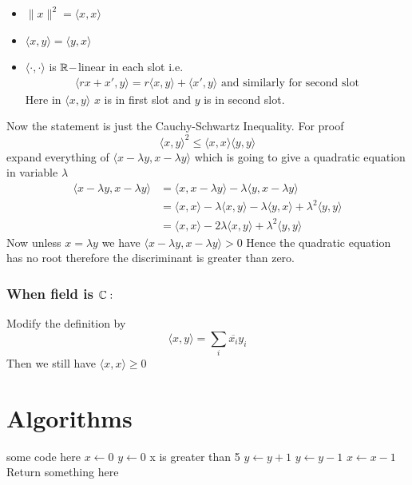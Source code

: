 \documentclass[a4paper]{report}
\begin{document}
{	\begin{note}
		\begin{itemize}
			\item $\|x\|^2=\langle x,x\rangle$
			\item $\langle x,y\rangle=\langle y,x\rangle$
			\item $\langle \cdot,\cdot\rangle$ is $\mathbb{R}-$linear in each slot i.e. \begin{align*}
				      \langle rx+x',y\rangle=r\langle x,y\rangle+\langle x',y\rangle	\text{ and similarly for second slot}
			      \end{align*}Here in $\langle x,y\rangle$ $x$ is in first slot and $y$ is in second slot.
		\end{itemize}
	\end{note}Now the statement is just the Cauchy-Schwartz Inequality. For proof $$\langle x,y\rangle^2\leq \langle x,x\rangle\langle y,y\rangle $$ expand everything of $\langle x-\lambda y,x-\lambda y\rangle$ which is going to give a quadratic equation in variable $\lambda $ \begin{align*}
		\langle x-\lambda y,x-\lambda y\rangle & =\langle x,x-\lambda y\rangle-\lambda\langle y,x-\lambda y\rangle                                       \\
		                                       & =\langle x ,x\rangle -\lambda\langle x,y\rangle -\lambda\langle y,x\rangle +\lambda^2\langle y,y\rangle \\
		                                       & =\langle x,x\rangle -2\lambda\langle x,y\rangle+\lambda^2\langle y,y\rangle
	\end{align*}Now unless $x=\lambda y$ we have $\langle x-\lambda y,x-\lambda y\rangle>0$ Hence the quadratic equation has no root therefore the discriminant is greater than zero.

	\subsubsection*{\textbf{When field is $\mathbb{C}:$}}Modify the definition by $$\langle x,y\rangle=\sum_i\overline{x_i}y_i$$Then we still have $\langle x,x\rangle\geq 0$}

\section{Algorithms}
\begin{algorithm}[H]
\SetAlgoLined
\SetNoFillComment
{}
\vspace{3mm}
some code here\;
$x \leftarrow 0$\;
$y \leftarrow 0$\;
 {
    x is greater than 5 
}
 {
    $y \leftarrow y + 1$\;
}
 {
    $y \leftarrow y - 1$\;
}
 {
    $x \leftarrow x - 1$\;
}
\Return Return something here\;
\caption{what}
\end{algorithm}
\fi
\end{document}
